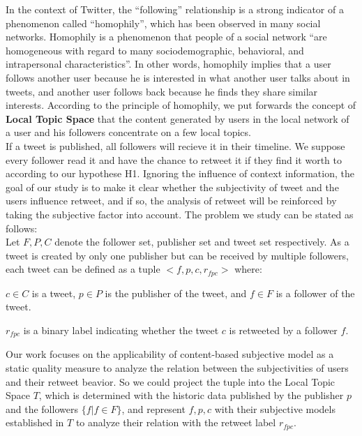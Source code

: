 \documentclass{acm_proc_article-sp}
\begin{document}
In the context of Twitter, the “following” relationship is a strong indicator of a phenomenon called “homophily”, which has been observed in many social networks.
Homophily is a phenomenon that people of a social network “are homogeneous with regard to many sociodemographic, behavioral, and intrapersonal characteristics”\cite{mcpherson2001birds}.
In other words, homophily implies that a user follows another user because he is interested in what another user talks about in tweets, and another user follows back because he finds they share similar interests. 
According to the principle of homophily, we put forwards the concept of \textbf{Local Topic Space} that the content generated by users in the local network of a user and his followers concentrate on a few local topics.\\
If a tweet is published, all followers will recieve it in their timeline. We suppose every follower read it and have the chance to retweet it if they find it worth to according to our hypothese H1.
Ignoring the influence of context information, the goal of our study is to make it clear whether the subjectivity of tweet and the users influence retweet, and if so, the analysis of retweet will be reinforced by taking the subjective factor into account.
The problem we study can be stated as follows:\\
Let $ F, P, C $ denote the follower set, publisher set and tweet set respectively. As a tweet is created by only one publisher but can be received by multiple followers, each tweet can be defined as a tuple $ <f, p, c, r_{fpc}>  $ where:
\begin{itemize*}
\item $ c \in C $ is a tweet, $ p \in P $ is the publisher of the tweet, and $ f \in F $ is a follower of the tweet.
\item $ r_{fpc} $ is a binary label indicating whether the tweet $ c $ is retweeted by a follower $ f $.
\end{itemize*}
Our work focuses on the applicability of content-based subjective model as a static quality measure to analyze the relation between the subjectivities of users and their retweet beavior. 
So we could project the tuple into the Local Topic Space $ T $, which is determined with the historic data published by the publisher $ p $ and the followers $ \{f|f \in F \} $, and represent $ f, p, c $ with their subjective models established in $ T $ to analyze their relation with the retweet label $ r_{fpc} $.
\end{document}
